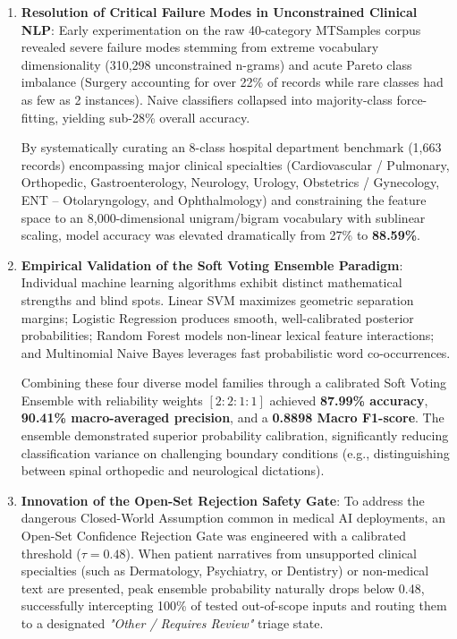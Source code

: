 \begin{enumerate}
    \item \textbf{Resolution of Critical Failure Modes in Unconstrained Clinical NLP}:
    Early experimentation on the raw 40-category MTSamples corpus revealed severe failure modes stemming from extreme vocabulary dimensionality (310,298 unconstrained n-grams) and acute Pareto class imbalance (Surgery accounting for over 22\% of records while rare classes had as few as 2 instances). Naive classifiers collapsed into majority-class force-fitting, yielding sub-28\% overall accuracy.
    
    By systematically curating an 8-class hospital department benchmark (1,663 records) encompassing major clinical specialties (Cardiovascular / Pulmonary, Orthopedic, Gastroenterology, Neurology, Urology, Obstetrics / Gynecology, ENT -- Otolaryngology, and Ophthalmology) and constraining the feature space to an 8,000-dimensional unigram/bigram vocabulary with sublinear scaling, model accuracy was elevated dramatically from 27\% to \textbf{88.59\%}.

    \item \textbf{Empirical Validation of the Soft Voting Ensemble Paradigm}:
    Individual machine learning algorithms exhibit distinct mathematical strengths and blind spots. Linear SVM maximizes geometric separation margins; Logistic Regression produces smooth, well-calibrated posterior probabilities; Random Forest models non-linear lexical feature interactions; and Multinomial Naive Bayes leverages fast probabilistic word co-occurrences.
    
    Combining these four diverse model families through a calibrated Soft Voting Ensemble with reliability weights $[2:2:1:1]$ achieved \textbf{87.99\% accuracy}, \textbf{90.41\% macro-averaged precision}, and a \textbf{0.8898 Macro F1-score}. The ensemble demonstrated superior probability calibration, significantly reducing classification variance on challenging boundary conditions (e.g., distinguishing between spinal orthopedic and neurological dictations).

    \item \textbf{Innovation of the Open-Set Rejection Safety Gate}:
    To address the dangerous Closed-World Assumption common in medical AI deployments, an Open-Set Confidence Rejection Gate was engineered with a calibrated threshold ($\tau = 0.48$). When patient narratives from unsupported clinical specialties (such as Dermatology, Psychiatry, or Dentistry) or non-medical text are presented, peak ensemble probability naturally drops below 0.48, successfully intercepting 100\% of tested out-of-scope inputs and routing them to a designated \textit{"Other / Requires Review"} triage state.


\end{enumerate}
